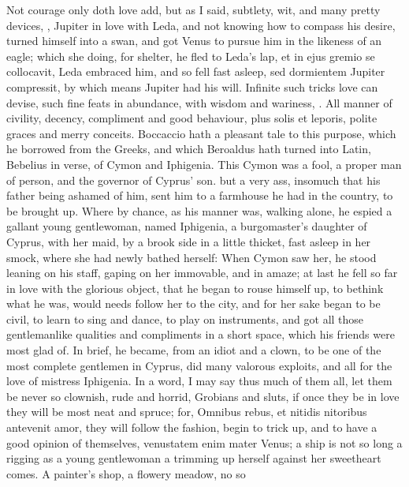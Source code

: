 {Not courage only doth love add, but as I said, subtlety, wit, and many
pretty devices, ,
Jupiter in love with Leda, and not knowing how to compass his
desire, turned himself into a swan, and got Venus to pursue him in the
likeness of an eagle; which she doing, for shelter, he fled to Leda's
lap, et in ejus gremio se collocavit, Leda embraced him, and so fell
fast asleep, sed dormientem Jupiter compressit, by which means Jupiter
had his will. Infinite such tricks love can devise, such fine feats in
abundance, with wisdom and wariness, .
All manner of civility, decency, compliment and good behaviour, plus
solis et leporis, polite graces and merry conceits. Boccaccio hath a
pleasant tale to this purpose, which he borrowed from the Greeks, and
which Beroaldus hath turned into Latin, Bebelius in verse, of Cymon and
Iphigenia. This Cymon was a fool, a proper man of person, and the
governor of Cyprus' son. but a very ass, insomuch that his father being
ashamed of him, sent him to a farmhouse he had in the country, to be
brought up. Where by chance, as his manner was, walking alone, he
espied a gallant young gentlewoman, named Iphigenia, a burgomaster's
daughter of Cyprus, with her maid, by a brook side in a little thicket,
fast asleep in her smock, where she had newly bathed herself: When
Cymon saw her, he stood leaning on his staff, gaping on her
immovable, and in amaze; at last he fell so far in love with the
glorious object, that he began to rouse himself up, to bethink what he
was, would needs follow her to the city, and for her sake began to be
civil, to learn to sing and dance, to play on instruments, and got all
those gentlemanlike qualities and compliments in a short space, which
his friends were most glad of. In brief, he became, from an idiot and a
clown, to be one of the most complete gentlemen in Cyprus, did many
valorous exploits, and all for the love of mistress Iphigenia. In a
word, I may say thus much of them all, let them be never so clownish,
rude and horrid, Grobians and sluts, if once they be in love they will
be most neat and spruce; for, Omnibus rebus, et nitidis nitoribus
antevenit amor, they will follow the fashion, begin to trick up, and to
have a good opinion of themselves, venustatem enim mater Venus; a ship
is not so long a rigging as a young gentlewoman a trimming up herself
against her sweetheart comes. A painter's shop, a flowery meadow, no so
}
